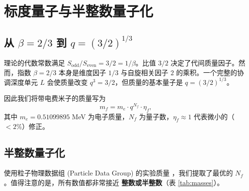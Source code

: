 \documentclass[12pt,a4paper]{article}
\begin{document}
	\section{标度量子与半整数量子化}
	
	\subsection{从 $\beta = 2/3$ 到 $q = (3/2)^{1/3}$}
	
	理论的代数常数满足 $S_{\mathrm{odd}}/S_{\mathrm{even}} = 3/2 = 1/\beta$。比值 $3/2$ 决定了代间质量因子。然而，指数 $\beta = 2/3$ 本身是维度因子 $1/3$ 与自旋相关因子 $2$ 的乘积。一个完整的协调深度单元 $L$ 会使质量改变 $q^3 = 3/2$，但质量的基本量子是 $q = (3/2)^{1/3}$。
	
	因此我们将带电费米子的质量写为
	\begin{equation}
		m_f = m_e \cdot q^{N_f} \cdot \eta_f,
		\label{eq:quantized}
	\end{equation}
	其中 $m_e = 0.51099895$ MeV 为电子质量，$N_f$ 为量子数，$\eta_f \approx 1$ 代表微小的（$<2\%$）修正。
	
	\subsection{半整数量子化}
	
	使用粒子物理数据组 (Particle Data Group) 的实验质量 \cite{PDG2024}，我们提取了最优的 $N_f$。值得注意的是，所有数值都非常接近 \textbf{整数或半整数}（表 \ref{tab:masses}）。
	
\end{document}
